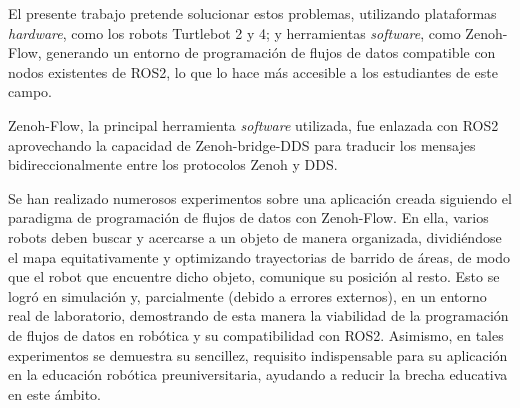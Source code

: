 El presente trabajo pretende solucionar estos problemas, utilizando plataformas
\textit{hardware}, como los robots Turtlebot 2 y 4; y herramientas
\textit{software}, como Zenoh-Flow, generando un entorno de programación de
flujos de datos compatible con nodos existentes de ROS2, lo que lo hace más
accesible a los estudiantes de este campo.

Zenoh-Flow, la principal herramienta \textit{software} utilizada, fue enlazada
con ROS2 aprovechando la capacidad de Zenoh-bridge-DDS para traducir los
mensajes bidireccionalmente entre los protocolos Zenoh y DDS.

Se han realizado numerosos experimentos sobre una aplicación creada siguiendo el
paradigma de programación de flujos de datos con Zenoh-Flow.
En ella, varios robots deben buscar y acercarse a un objeto de manera
organizada, dividiéndose el mapa equitativamente y optimizando trayectorias de
barrido de áreas, de modo que el robot que encuentre dicho objeto, comunique su
posición al resto.
Esto se logró en simulación y, parcialmente (debido a errores externos), en un
entorno real de laboratorio, demostrando de esta manera la viabilidad de la
programación de flujos de datos en robótica y su compatibilidad con ROS2.
Asimismo, en tales experimentos se demuestra su sencillez, requisito
indispensable para su aplicación en la educación robótica preuniversitaria,
ayudando a reducir la brecha educativa en este ámbito.
